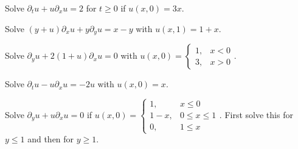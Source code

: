 \documentclass[12pt]{exam}
\newcommand{\px}{\partial_x}
\newcommand{\py}{\partial_y}
\newcommand{\pt}{\partial_t}
\begin{document}
\newpage 
\begin{questions}
\question Solve $\pt u + u\px u = 2$ for $t\geq 0$ if $u(x,0) = 3x$. 
\begin{solutionorbox}[\stretch{1}]
\end{solutionorbox}

\newpage 
\question Solve $(y+u)\px u + y\py u = x-y$ with $u(x,1) = 1+x$.
\begin{solutionorbox}[\stretch{1}]
\end{solutionorbox}

\newpage 
\question Solve $\py u + 2(1+u)\px u = 0$ with $u(x,0) = \begin{cases}1, & x<0\\ 
3, & x>0\end{cases}$.
\begin{solutionorbox}[\stretch{1}]
\end{solutionorbox}

\newpage 
\question Solve $\pt u - u\px u = - 2u$ with $u(x,0) = x$.
\begin{solutionorbox}[\stretch{1}]
\end{solutionorbox}

\newpage 
\question Solve $\py u + u \px u = 0$ if 
$u(x,0) = \begin{cases}1, &x\leq 0\\ 1-x,& 0\leq x \leq 1\\ 0,& 1\leq x\end{cases}$. 
First solve this for $y\leq 1$ and then for $y\geq 1$.
\begin{solutionorbox}[\stretch{1}]
\end{solutionorbox}
\end{questions}
\end{document}
